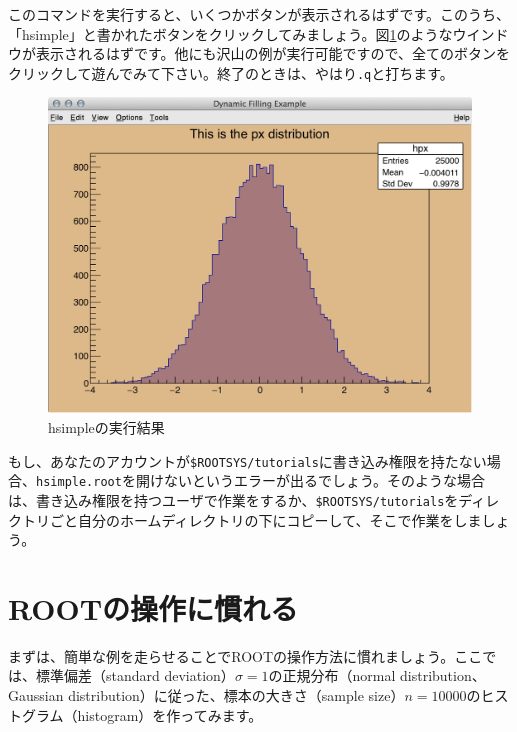 このコマンドを実行すると、いくつかボタンが表示されるはずです。このうち、「hsimple」と書かれたボタンをクリックしてみましょう。図\ref{fig_hsimple}のようなウインドウが表示されるはずです。他にも沢山の例が実行可能ですので、全てのボタンをクリックして遊んでみて下さい。終了のときは、やはり\texttt{.q}と打ちます。

\begin{figure}
  \centering
  \includegraphics[width=12cm]{fig/hsimple.png}
  \caption{hsimpleの実行結果}
  \label{fig_hsimple}
\end{figure}

もし、あなたのアカウントが\texttt{\$ROOTSYS/tutorials}に書き込み権限を持たない場合、\texttt{hsimple.root}を開けないというエラーが出るでしょう。そのような場合は、書き込み権限を持つユーザで作業をするか、\texttt{\$ROOTSYS/tutorials}をディレクトリごと自分のホームディレクトリの下にコピーして、そこで作業をしましょう。

\section{ROOTの操作に慣れる}

まずは、簡単な例を走らせることでROOTの操作方法に慣れましょう。ここでは、標準偏差（standard deviation）$\sigma=1$の正規分布（normal distribution、Gaussian distribution）に従った、標本の大きさ（sample size）$n=10000$のヒストグラム（histogram）を作ってみます。

